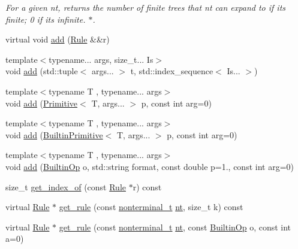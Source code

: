 \begin{DoxyCompactItemize}
\begin{DoxyCompactList}\small\item\em For a given nt, returns the number of finite trees that nt can expand to if its finite; 0 if its infinite. $\ast$. \end{DoxyCompactList}\item 
virtual void \hyperlink{class_grammar_a0be4926e40ea476152a5a87a1c83f167}{add} (\hyperlink{class_rule}{Rule} \&\&r)
\item 
{\footnotesize template$<$typename... args, size\+\_\+t... Is$>$ }\\void \hyperlink{class_grammar_a3c4f41d4b1ff3c9973cb13ccea2c57fb}{add} (std\+::tuple$<$ args... $>$ t, std\+::index\+\_\+sequence$<$ Is... $>$)
\item 
{\footnotesize template$<$typename T , typename... args$>$ }\\void \hyperlink{class_grammar_a86dfa9ce87af1779799e617bb3252220}{add} (\hyperlink{struct_primitive}{Primitive}$<$ T, args... $>$ p, const int arg=0)
\item 
{\footnotesize template$<$typename T , typename... args$>$ }\\void \hyperlink{class_grammar_a52b751ef5987563d4045692199dba16c}{add} (\hyperlink{struct_builtin_primitive}{Builtin\+Primitive}$<$ T, args... $>$ p, const int arg=0)
\item 
{\footnotesize template$<$typename T , typename... args$>$ }\\void \hyperlink{class_grammar_ada3a7374f7aa01a1db5b938e8b9dfa2d}{add} (\hyperlink{_instruction_8h_af2fb7c87c5854c5733d7bb0506b06de7}{Builtin\+Op} o, std\+::string format, const double p=1., const int arg=0)
\item 
size\+\_\+t \hyperlink{class_grammar_a16885c3de4a6e3fd31ddab136cd9fea8}{get\+\_\+index\+\_\+of} (const \hyperlink{class_rule}{Rule} $\ast$r) const
\item 
virtual \hyperlink{class_rule}{Rule} $\ast$ \hyperlink{class_grammar_a9ed04fb2a2a8e2f0e4f11b711647a02c}{get\+\_\+rule} (const \hyperlink{_nonterminal_8h_a1c5bfe9b903f69c83bbde5da7035fef3}{nonterminal\+\_\+t} \hyperlink{class_grammar_a047b55bfbd87c52e9d969af62c2932ab}{nt}, size\+\_\+t k) const
\item 
virtual \hyperlink{class_rule}{Rule} $\ast$ \hyperlink{class_grammar_a57835af24b91d1c193f2906b43282350}{get\+\_\+rule} (const \hyperlink{_nonterminal_8h_a1c5bfe9b903f69c83bbde5da7035fef3}{nonterminal\+\_\+t} \hyperlink{class_grammar_a047b55bfbd87c52e9d969af62c2932ab}{nt}, const \hyperlink{_instruction_8h_af2fb7c87c5854c5733d7bb0506b06de7}{Builtin\+Op} o, const int a=0)

\end{DoxyCompactItemize}
